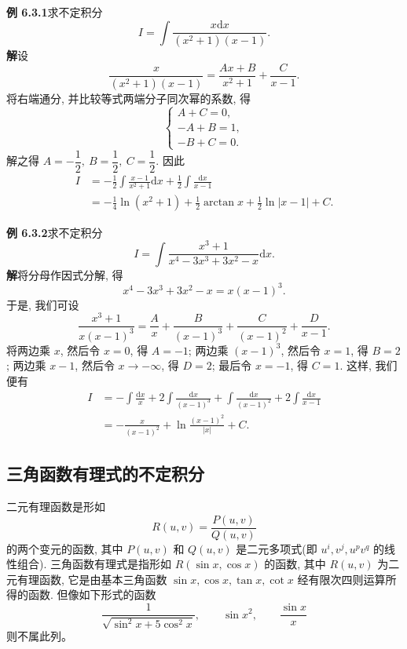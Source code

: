 \documentclass[UTF8,12pt,a4paper,fontset=fandol]{ctexart}
\begin{document}
\noindent\textbf{例 6.3.1}\quad 求不定积分
\[
  I=\int\frac{x\mathrm dx}{(x^2+1)(x-1)}.
\]
\noindent\textbf{解}\quad 设
\[
  \frac{x}{(x^2+1)(x-1)}
  =
  \frac{Ax+B}{x^2+1}+\frac C{x-1}.
\]
将右端通分, 并比较等式两端分子同次幂的系数, 得
\[
  \begin{cases}
    A+C=0,\\
    -A+B=1,\\
    -B+C=0.
  \end{cases}
\]
解之得 $A=-\dfrac12,\ B=\dfrac12,\ C=\dfrac12$. 因此
\[
\begin{aligned}
  I
  &=
  -\frac12\int\frac{x-1}{x^2+1}\mathrm dx+\frac12\int\frac{\mathrm dx}{x-1}\\
  &=
  -\frac14\ln(x^2+1)+\frac12\arctan x+\frac12\ln|x-1|+C.
\end{aligned}
\]

\noindent\textbf{例 6.3.2}\quad 求不定积分
\[
  I=\int\frac{x^3+1}{x^4-3x^3+3x^2-x}\mathrm dx.
\]
\noindent\textbf{解}\quad 将分母作因式分解, 得
\[
  x^4-3x^3+3x^2-x=x(x-1)^3.
\]
于是, 我们可设
\[
  \frac{x^3+1}{x(x-1)^3}
  =
  \frac Ax+\frac B{(x-1)^3}+\frac C{(x-1)^2}+\frac D{x-1}.
\]
将两边乘 $x$, 然后令 $x=0$, 得 $A=-1$; 两边乘 $(x-1)^3$, 然后令 $x=1$, 得 $B=2$; 两边乘 $x-1$, 然后令 $x\to-\infty$, 得 $D=2$; 最后令 $x=-1$, 得 $C=1$. 这样, 我们便有
\[
\begin{aligned}
  I
  &=
  -\int\frac{\mathrm dx}x+2\int\frac{\mathrm dx}{(x-1)^3}
  +\int\frac{\mathrm dx}{(x-1)^2}+2\int\frac{\mathrm dx}{x-1}\\
  &=
  -\frac{x}{(x-1)^2}+\ln\frac{(x-1)^2}{|x|}+C.
\end{aligned}
\]

\subsection{三角函数有理式的不定积分}

二元有理函数是形如
\[
  R(u,v)=\frac{P(u,v)}{Q(u,v)}
\]
的两个变元的函数, 其中 $P(u,v)$ 和 $Q(u,v)$ 是二元多项式(即 $u^i,v^j,u^pv^q$ 的线性组合). 三角函数有理式是指形如 $R(\sin x,\cos x)$ 的函数, 其中 $R(u,v)$ 为二元有理函数, 它是由基本三角函数 $\sin x,\cos x,\tan x,\cot x$ 经有限次四则运算所得的函数. 但像如下形式的函数
\[
  \frac1{\sqrt{\sin^2x+5\cos^2x}},\qquad
  \sin x^2,\qquad
  \frac{\sin x}{x}
\]
则不属此列。
\end{document}
